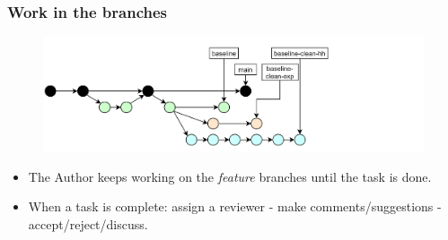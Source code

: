 \documentclass[aspectratio=169]{beamer}
\begin{document}
\begin{frame}
	\frametitle{Work in the branches}

	\vspace{-.5cm}
	\begin{minipage}[t][5cm][t]{\textwidth}
		\begin{figure}
			\centering
			\includegraphics[width=\textwidth]{./img/dime-gitflow-network-2-3.png}
		\end{figure}
	\end{minipage}

	\vspace{-.5cm}
	\begin{minipage}[t][5cm][t]{\textwidth}
		\begin{itemize}
			\setlength\itemsep{.5em}
			\item The Author keeps working on the \textit{feature} branches until
			the task is done.
			\item When a task is complete: assign a reviewer
			- make comments/suggestions - accept/reject/discuss.
		\end{itemize}
	\end{minipage}
\end{frame}
\end{document}
